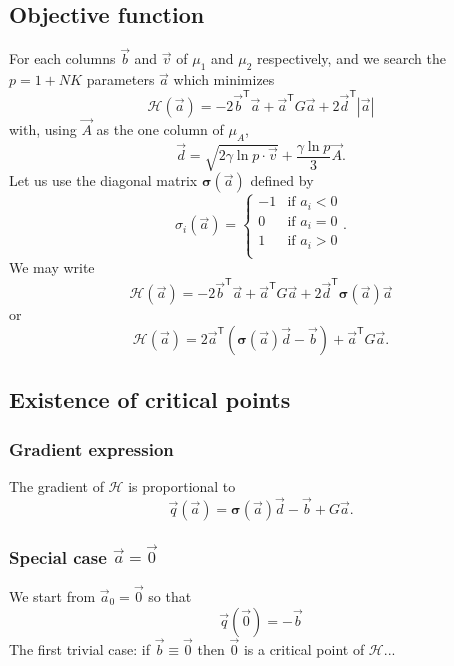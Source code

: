 \documentclass{revtex4}
\newcommand{\abs}[1]{\left|#1\right|}
\newcommand{\trn}[1]{{#1}^{\mathsf{T}}}
\begin{document}
\subsection{Objective function}
For each columns $\vec{b}$ and $\vec{v}$ of $\mu_1$ and $\mu_2$ respectively, and we search the $p=1+NK$ parameters $\vec{a}$ which minimizes
\begin{equation}
	\mathcal{H}\left(\vec{a}\right) = -2\trn{\vec{b}}\vec{a} + \trn{\vec{a}} G \vec{a} +2 \trn{\vec{d}} \abs{\vec{a}}
\end{equation}
with, using $\vec{A}$ as the one column of $\mu_A$, 
\begin{equation}
	\vec{d} = \sqrt{2\gamma \ln p \cdot \vec{v}} + \dfrac{\gamma\ln p}{3} \vec{A}. 
\end{equation}
Let us use the diagonal matrix 
$\bm{\sigma}\left(\vec{a}\right)$ defined by
\begin{equation}
	\sigma_{i}\left({\vec{a}}\right) = \left\lbrace
	\begin{array}{rl}
	-1 & \text{if $a_i<0$}\\
	0  & \text{if $a_i=0$}\\
	1  & \text{if $a_i>0$}\\
	\end{array}
	\right.
	.
\end{equation}
We may write
\begin{equation}
	\mathcal{H}\left(\vec{a}\right) = -2\trn{\vec{b}}\vec{a} + \trn{\vec{a}} G \vec{a} + 2 \trn{\vec{d}} \bm{\sigma}\left(\vec{a}\right) \vec{a}
\end{equation}
or
\begin{equation}
	\mathcal{H}\left(\vec{a}\right) = 2\trn{\vec{a}}\left(\bm{\sigma}\left({\vec{a}}\right)\vec{d}-\vec{b}\right) +  \trn{\vec{a}} G \vec{a}.
\end{equation}
\subsection{Existence of critical points}
\subsubsection{Gradient expression}
The gradient of
  $\mathcal{H}$  is proportional to
\begin{equation}
	\vec{q}\left(\vec{a}\right) = \bm{\sigma}\left({\vec{a}}\right) \vec{d} -\vec{b} + G \vec{a}.
\end{equation}
\subsubsection{Special case $\vec{a}=\vec{0}$}
We start from $\vec{a}_0=\vec{0}$ so that
\begin{equation}
	\vec{q}\left(\vec{0}\right)=-\vec{b}
\end{equation}
The first trivial case: if $\vec{b}\equiv\vec{0}$ then $\vec{0}$ is a critical point of $\mathcal{H}$...
\end{document}

